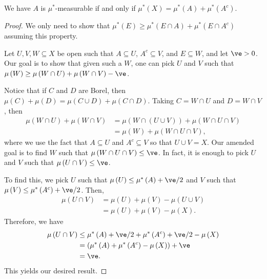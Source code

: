 \documentclass[10pt]{mypackage}
\begin{document}
\begin{proposition}
  We have $A$ is $\mu^{\ast}$-measurable if and only if $\mu^{\ast}\left( X \right) = \mu^{\ast}\left( A \right) + \mu^{\ast}\left( A^{c} \right)$.
\end{proposition}
\begin{proof}
  We only need to show that $\mu^{\ast}\left( E \right)\geq \mu^{\ast}\left( E\cap A \right) + \mu^{\ast}\left( E\cap A^{c} \right)$ assuming this property.

  Let $U,V,W\subseteq X$ be open such that $A\subseteq U$, $A^{c}\subseteq V$, and $E\subseteq W$, and let $ \ve > 0 $. Our goal is to show that given such a $W$, one can pick $U$ and $V$ such that $\mu\left( W \right) \geq \mu\left( W\cap U \right) + \mu\left( W\cap V \right) - \ve$.

  Notice that if $C$ and $D$ are Borel, then $\mu\left( C \right) + \mu\left( D \right) = \mu\left( C\cup D \right) + \mu\left( C\cap D \right)$. Taking $C = W\cap U$ and $D = W\cap V$, then
  \begin{align*}
    \mu\left( W\cap U \right) + \mu\left( W\cap V \right) &= \mu\left( W\cap \left( U\cup V \right) \right) + \mu\left( W\cap U \cap V \right)\\
                                                          &= \mu\left( W \right) + \mu\left( W\cap U \cap V \right),
  \end{align*}
  where we use the fact that $A\subseteq U$ and $A^{c}\subseteq V$ so that $U\cup V = X$. Our amended goal is to find $W$ such that $\mu\left( W\cap U\cap V \right) \leq \ve$. In fact, it is enough to pick $U$ and $V$ such that $\mu\left( U\cap V \right)\leq \ve$.

  To find this, we pick $U$ such that $\mu\left( U \right)\leq \mu^{\ast}\left( A \right) + \ve/2$ and $V$ such that $\mu\left( V \right) \leq \mu^{\ast}\left( A^{c} \right) + \ve/2$. Then,
  \begin{align*}
    \mu\left( U\cap V \right) &= \mu\left( U \right) + \mu\left( V \right) - \mu\left( U\cup V \right)\\
                              &= \mu\left( U \right) + \mu\left( V \right) - \mu\left( X \right).
  \end{align*}
  Therefore, we have
  \begin{align*}
    \mu\left( U\cap V \right) &\leq \mu^{\ast}\left( A \right) + \ve/2 + \mu^{\ast}\left( A^{c} \right) + \ve/2 -\mu\left( X \right)\\
                              &= \left( \mu^{\ast}\left( A \right) + \mu^{\ast}\left( A^{c} \right) - \mu\left( X \right) \right) + \ve\\
                              &= \ve.
  \end{align*}
  This yields our desired result.
\end{proof}
\end{document}
